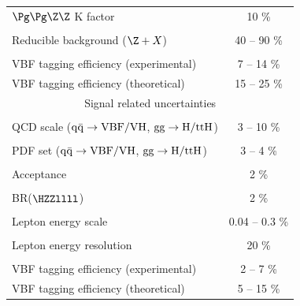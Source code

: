 \begin{table}
\begin{center}
\begin{tabular}{|lc|}
$\Pg\Pg\Z\Z$ K factor & 10 \% \\
\vspace{-0.4cm} & \\
Reducible background ($\Z+X$) & 40 -- 90 \% \\
\vspace{-0.4cm} & \\
VBF tagging efficiency (experimental) & 7 -- 14 \% \\
VBF tagging efficiency (theoretical) & 15 -- 25 \% \\
\hline %
\hline %
\multicolumn{2}{|c|}{Signal related uncertainties} \\
\hline %
\vspace{-0.4cm} & \\
QCD scale (${\rm q}\bar{\rm q}\to{\rm VBF/VH}$, ${\rm gg}\to{\rm H/ttH}$) & 3 -- 10 \% \\
\vspace{-0.4cm} & \\
PDF set (${\rm q}\bar{\rm q}\to{\rm VBF/VH}$, ${\rm gg}\to{\rm H/ttH}$) & 3 -- 4 \% \\
\vspace{-0.4cm} & \\
Acceptance & 2 \% \\
\vspace{-0.4cm} & \\
BR($\HZZllll$) & 2 \% \\
\vspace{-0.4cm} & \\
Lepton energy scale & 0.04 -- 0.3 \% \\
\vspace{-0.4cm} & \\
Lepton energy resolution & 20 \% \\
\vspace{-0.4cm} & \\
VBF tagging efficiency (experimental) & 2 -- 7 \% \\
VBF tagging efficiency (theoretical) & 5 -- 15 \% \\
\hline %
\hline %
\end{tabular}
\normalsize
\end{center}
\end{table}
